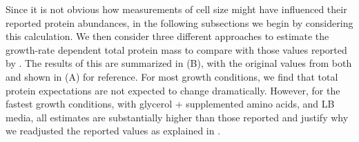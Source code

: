 \begin{figure}
\end{figure}

Since it is not obvious how measurements of cell size might have influenced
their reported protein abundances, in the following subsections we begin by considering
this calculation. We then consider three different approaches to estimate
the growth-rate dependent total protein mass to compare with those values reported by \cite{schmidt_2016}.
The results of this are summarized in  (B),
with the original values from both \cite{schmidt_2016} and \cite{li_2014} shown in
(A) for reference.
For most growth conditions, we find that
total protein expectations are not expected to change dramatically. However, for
the fastest growth conditions, with glycerol + supplemented amino acids, and LB
media, all estimates are substantially higher than those reported and justify why we
readjusted the reported values as explained in .



%

